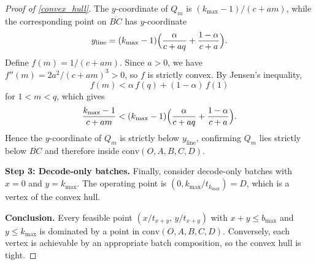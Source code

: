 \documentclass[11pt]{article}
\theoremstyle{plain}
\theoremstyle{definition}
\theoremstyle{remark}
\begin{document}
\begin{proof}[Proof of \cref{convex_hull}]
The \( y \)-coordinate of \( Q_m \) is \( (k_{\max} - 1)/(c + am) \), while the corresponding point on \( \overline{BC} \) has \( y \)-coordinate
\[
y_{\mathrm{line}} = (k_{\max} - 1) \Bigl( \frac{\alpha}{c + aq} + \frac{1 - \alpha}{c + a} \Bigr).
\]
Define \( f(m) = 1/(c + am) \). Since \( a > 0 \), we have \( f''(m) = 2a^2/(c + am)^3 > 0 \), so \( f \) is strictly convex. By Jensen's inequality,
\[
f(m) < \alpha\, f(q) + (1 - \alpha)\, f(1)
\]
for \( 1 < m < q \), which gives
\[
\frac{k_{\max} - 1}{c + am} < (k_{\max} - 1) \Bigl( \frac{\alpha}{c + aq} + \frac{1 - \alpha}{c + a} \Bigr).
\]
Hence the \( y \)-coordinate of \( Q_m \) is strictly below \( y_{\mathrm{line}} \), confirming \( Q_m \) lies strictly below \( \overline{BC} \) and therefore inside \( \mathrm{conv}(O, A, B, C, D) \).

\textbf{Step 3: Decode-only batches.} Finally, consider decode-only batches with \( x = 0 \) and \( y = k_{\max} \). The operating point is \( (0, k_{\max}/t_{k_{\max}}) = D \), which is a vertex of the convex hull.

\textbf{Conclusion.} Every feasible point \( (x/t_{x+y},\, y/t_{x+y}) \) with \( x + y \le b_{\max} \) and \( y \le k_{\max} \) is dominated by a point in \( \mathrm{conv}(O, A, B, C, D) \). Conversely, each vertex is achievable by an appropriate batch composition, so the convex hull is tight.
\end{proof}
\end{document}
